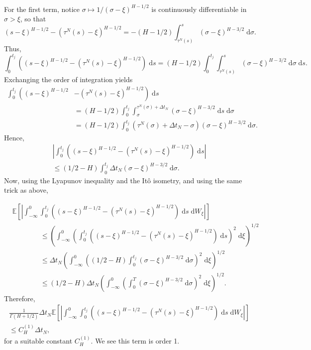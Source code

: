 \documentclass[reqno,12pt]{amsart}
\theoremstyle{plain}%
\theoremstyle{definition}
\begin{document}
For the first term, notice $\sigma \mapsto 1/(\sigma - \xi)^{H-1/2}$ is continuously differentiable in $\sigma > \xi$, so that
\[
    (s-\xi)^{H-1/2} - (\tau^N(s)-\xi)^{H-1/2} = - (H-1/2)\int_{\tau^N(s)}^s (\sigma - \xi)^{H - 3/2} \;\mathrm{d}\sigma.
\]
Thus,
\[
    \int_{0}^{t_j} \left( (s-\xi)^{H-1/2} - (\tau^N(s)-\xi)^{H-1/2}\right) \;\mathrm{d}s = (H-1/2)\int_{0}^{t_j} \int_{\tau^N(s)}^s (\sigma - \xi)^{H - 3/2} \;\mathrm{d}\sigma \;\mathrm{d}s.
\]
Exchanging the order of integration yields
\begin{align*}
    \int_{0}^{t_j} \left( (s-\xi)^{H-1/2} \right. & \left. - (\tau^N(s)-\xi)^{H-1/2} \right) \;\mathrm{d}s \\
    & = (H-1/2)\int_{0}^{t_j} \int_{\sigma}^{\tau^N(\sigma) + \Delta t_N} (\sigma - \xi)^{H - 3/2} \;\mathrm{d}s \;\mathrm{d}\sigma \\
    & = (H-1/2)\int_{0}^{t_j} \left(\tau^N(\sigma) + \Delta t_N - \sigma\right) (\sigma - \xi)^{H - 3/2} \;\mathrm{d}\sigma.
\end{align*}
Hence,
\begin{multline*}
    \left|\int_{0}^{t_j} \left( (s-\xi)^{H-1/2} - (\tau^N(s)-\xi)^{H-1/2} \right) \;\mathrm{d}s\right| \\
    \leq (1/2 - H)\int_{0}^{t_j} \Delta t_N (\sigma - \xi)^{H - 3/2} \;\mathrm{d}\sigma.
\end{multline*}
Now, using the Lyapunov inequality and the It\^o isometry, and using the same trick as above,

\begin{align*}
    & \mathbb{E}\left[\left|\int_{-\infty}^{0} \int_{0}^{t_j} \left( (s-\xi)^{H-1/2} - (\tau^N(s)-\xi)^{H-1/2}\right) \;\mathrm{d}s \;\mathrm{d}W_\xi \right|\right] \\
    & \qquad\qquad \leq \left(\int_{-\infty}^{0} \left(\int_{0}^{t_j} \left( (s-\xi)^{H-1/2} - (\tau^N(s)-\xi)^{H-1/2}\right) \;\mathrm{d}s \right)^2 \;\mathrm{d}\xi \right)^{1/2} \\
    & \qquad\qquad \leq \Delta t_N \left(\int_{-\infty}^{0} \left( (1/2 - H)\int_0^{t_j} (\sigma - \xi)^{H-3/2} \;\mathrm{d}\sigma \right)^2 \;\mathrm{d}\xi \right)^{1/2} \\
    & \qquad\qquad \leq (1/2 - H)\Delta t_N \left(\int_{-\infty}^{0} \left(\int_0^T (\sigma - \xi)^{H-3/2} \;\mathrm{d}\sigma \right)^2 \;\mathrm{d}\xi \right)^{1/2}.
\end{align*}
Therefore,
\begin{multline}
    \label{firsttermfBm}
    \frac{1}{\Gamma(H + 1/2)}\Delta t_N \mathbb{E}\left[\left|\int_{-\infty}^{0} \int_{0}^{t_j} \left( (s-\xi)^{H-1/2} - (\tau^N(s)-\xi)^{H-1/2}\right) \;\mathrm{d}s \;\mathrm{d}W_\xi \right|\right] \\
    \leq C_H^{(1)}\Delta t_N,
\end{multline}
for a suitable constant $C_H^{(1)}$. We see this term is order 1.
\end{document}

